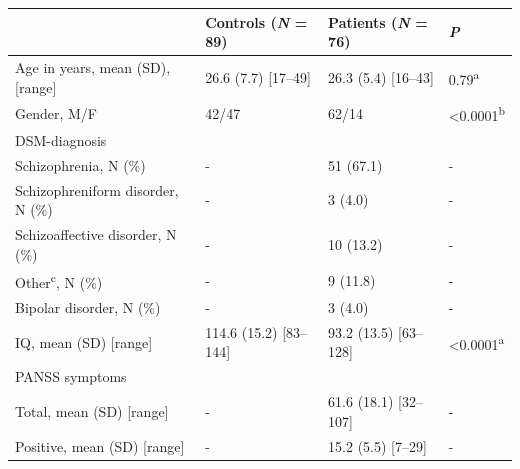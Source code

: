 \begin{refsection}
\begin{table}
\renewcommand{\arraystretch}{0.8}
\centering
\small
{}\selectfont
{}
\begin{tabular}{@{}llll@{}}
\toprule
                                                        & Controls (\textit{N} = 89)          & Patients (\textit{N} = 76)          & \textit{P}                 \\ \midrule
Age in years, mean (SD), {[}range{]}                    & 26.6 (7.7) {[}17–49{]}     & 26.3 (5.4) {[}16–43{]}     & 0.79\textsuperscript{a}             \\
Gender, M/F                                             & 42/47                      & 62/14                      & \textless 0.0001\textsuperscript{b} \\
DSM-diagnosis                                           &                            &                            &                   \\
Schizophrenia, N (\%)                                   & -                          & 51 (67.1)                  & -                 \\
Schizophreniform disorder, N (\%)                       & -                          & 3 (4.0)                    & -                 \\
Schizoaffective disorder, N (\%)                        & -                          & 10 (13.2)                  & -                 \\
Other\textsuperscript{c}, N (\%)                                          & -                          & 9 (11.8)                   & -                 \\
Bipolar disorder, N (\%)                                & -                          & 3 (4.0)                    & -                 \\
IQ, mean (SD) {[}range{]}                               & 114.6 (15.2) {[}83–144{]}  & 93.2 (13.5) {[}63–128{]}   & \textless 0.0001\textsuperscript{a} \\
PANSS symptoms                                          &                            &                            &                   \\
Total, mean (SD) {[}range{]}                            & -                          & 61.6 (18.1) {[}32–107{]}   & -                 \\
Positive, mean (SD) {[}range{]}                         & -                          & 15.2 (5.5) {[}7–29{]}      & -                 \\

\end{tabular}
\end{table}
\end{refsection}
